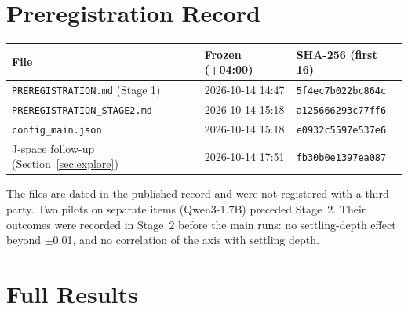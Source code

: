 \documentclass[11pt]{article}
\begin{document}
\section{Preregistration Record}\label{app:prereg}

\begin{tabular}{@{}lll@{}}
\toprule
File & Frozen (+04:00) & SHA-256 (first 16) \\
\midrule
\texttt{PREREGISTRATION.md} (Stage 1) & 2026-10-14 14:47 & \texttt{5f4ec7b022bc864c} \\
\texttt{PREREGISTRATION\_STAGE2.md} & 2026-10-14 15:18 & \texttt{a125666293c77ff6} \\
\texttt{config\_main.json} & 2026-10-14 15:18 & \texttt{e0932c5597e537e6} \\
J-space follow-up (Section~\ref{sec:explore}) & 2026-10-14 17:51 & \texttt{fb30b0e1397ea087} \\
\bottomrule
\end{tabular}

\medskip
The files are dated in the published record and were not registered with a third party. Two pilots on separate items (Qwen3-1.7B) preceded Stage~2. Their outcomes were recorded in Stage~2 before the main runs: no settling-depth effect beyond $\pm$0.01, and no correlation of the axis with settling depth.

\section{Full Results}\label{app:full}
\end{document}
